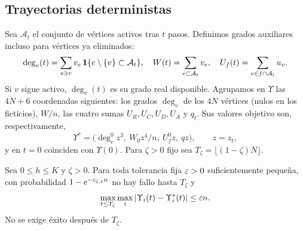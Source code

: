 \subsection{Trayectorias deterministas}

Sea $\mathcal A_t$ el conjunto de vértices activos tras $t$ pasos. Definimos grados auxiliares
incluso para vértices ya eliminados:
\[
 \deg_v(t)=\sum_{e\ni v}v_e\,\mathbf{1}\{e\setminus\{v\}\subset\mathcal A_t\},\quad
 W(t)=\sum_{e\subset\mathcal A_t}v_e,\quad U_f(t)=\sum_{v\in f\cap\mathcal A_t}u_v .
\]
Si $v$ sigue activo, $\deg_v(t)$ es su grado real disponible. Agrupamos en $\Upsilon$ las $4N+6$
coordenadas siguientes: los grados $\deg_v$ de los $4N$ vértices (nulos en los ficticios),
$W/n$, las cuatro sumas $U_R,U_C,U_D,U_A$ y $q_t$. Sus valores objetivo son, respectivamente,
\[
 \Upsilon^*=\bigl(\deg_v^0z^3,\ W_0z^4/n,\ U_f^0z,\ qz\bigr),\qquad z=z_t ,
\]
y en $t=0$ coinciden con $\Upsilon(0)$. Para $\zeta>0$ fijo sea $T_\zeta=\lfloor(1-\zeta)N\rfloor$.

\begin{lema}\label{lem:regularidad}
Sea $0\le h\le K$ y $\zeta>0$. Para toda tolerancia fija $\varepsilon>0$ suficientemente pequeña, con
probabilidad $1-e^{-c_{\zeta,\varepsilon}n}$ no hay fallo hasta $T_\zeta$ y
\begin{equation}\label{eq:regularidad}
 \max_{t\le T_\zeta}\max_i|\Upsilon_i(t)-\Upsilon_i^*(t)|\le\varepsilon n .
\end{equation}
No se exige éxito después de $T_\zeta$.
\end{lema}

